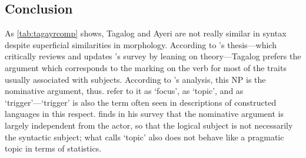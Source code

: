 
\subsection{Conclusion}

As \autoref{tab:tagayrcomp} shows, Tagalog and Ayeri are not really similar in
syntax despite superficial similarities in morphology. According to
\citet{kroeger1991}'s thesis---which critically reviews and updates
\citet{schachter1976}'s survey by leaning on \Lfg{} theory---Tagalog prefers
the argument which corresponds to the marking on the verb for most of the
traits usually associated with subjects. According to \citet{kroeger1991}'s
analysis, this NP is the nominative argument, thus. \citet{schachterotanes1972}
refer to it as `focus', \citet{schachter1976} as `topic', and
\citet{schachter2015} as `trigger'---`trigger' is also the term often seen in
descriptions of constructed languages in this respect. \citet{kroeger1991}
finds in his survey that the nominative argument is largely independent from
the actor, so that the logical subject is not necessarily the syntactic
subject; what \citet{schachter1976} calls `topic' also does not behave like a
pragmatic topic in terms of statistics.

